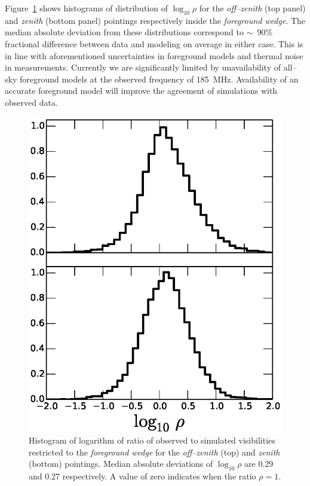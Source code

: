 \documentclass[preprint2,iop,numberedappendix]{emulateapj}
\begin{document}
Figure~\ref{fig:data-sim-ratio} shows histograms of distribution of $\log_{10}\rho$ for the {\it off--zenith} (top panel) and {\it zenith} (bottom panel) pointings respectively inside the {\it foreground wedge}. The median absolute deviation from these distributions correspond to $\sim$~90\% fractional difference between data and modeling on average in either case. This is in line with aforementioned uncertainties in foreground models and thermal noise in measurements. Currently we are significantly limited by unavailability of all--sky foreground models at the observed frequency of 185~MHz. Availability of an accurate foreground model will improve the agreement of simulations with observed data. 

\begin{figure}[htb]
\centering
\includegraphics[width=\linewidth]{figures/v1_0/delta_array_histogram_wedge_sim_data_log_ratio_0.3m_ground_custom_gaussian_FG_model_asm_all_sky_nside_64_Tsys_90.0K_185.0_MHz_30.7_MHz_bnw2.0.eps}
\caption{Histogram of logarithm of ratio of observed to simulated visibilities restricted to the {\it foreground wedge} for the {\it off--zenith} (top) and {\it zenith} (bottom) pointings. Median absolute deviations of $\log_{10}\rho$ are 0.29 and 0.27 respectively. A value of zero indicates when the ratio $\rho=1$. \label{fig:data-sim-ratio}}

\end{figure}
\end{document}
